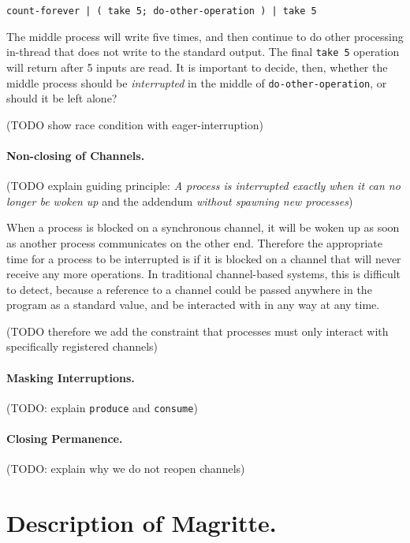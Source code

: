 \documentclass[format=sigconf, review=true, draft=true, screen=true]{acmart}
\begin{document}
\begin{verbatim}
count-forever | ( take 5; do-other-operation ) | take 5
\end{verbatim}

The middle process will write five times, and then continue to do other processing in-thread that does not write to the standard output.
The final \verb/take 5/ operation will return after 5 inputs are read.
It is important to decide, then, whether the middle process should be \emph{interrupted} in the middle of \verb/do-other-operation/, or should it be left alone?

(TODO show race condition with eager-interruption)

\paragraph{Non-closing of Channels.}

(TODO explain guiding principle: \emph{A process is interrupted exactly when it can no longer be woken up} and the addendum \emph{without spawning new processes})

When a process is blocked on a synchronous channel, it will be woken up as soon as another process communicates on the other end.
Therefore the appropriate time for a process to be interrupted is if it is blocked on a channel that will never receive any more operations.
In traditional channel-based systems, this is difficult to detect, because a reference to a channel could be passed anywhere in the program as a standard value, and be interacted with in any way at any time.

(TODO therefore we add the constraint that processes must only interact with specifically registered channels)

\paragraph{Masking Interruptions.} (TODO: explain \verb/produce/ and \verb/consume/)

\paragraph{Closing Permanence.}
(TODO: explain why we do not reopen channels)

\section{Description of Magritte.}
\end{document}
